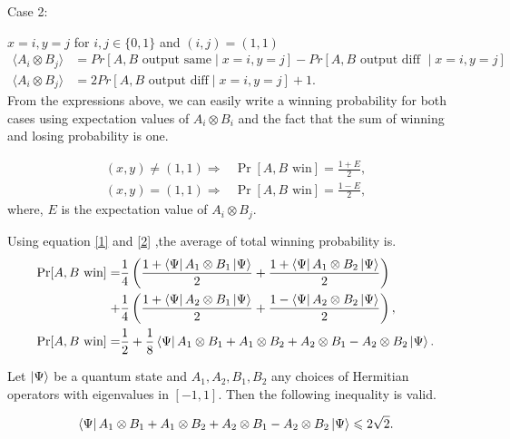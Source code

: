 Case 2:

$x=i,y=j$ for $i,j\in \{0,1\}$ and $(i,j)= (1,1)$
\begin{align}
\langle A_i\otimes B_j\rangle &=Pr[A,B \text{ output same} \mid  x=i,y=j]-Pr[A,B \text{ output diff }  \mid  x=i,y=j]\\
\langle A_i\otimes B_j\rangle&=2Pr[A,B \text{ output diff} \mid  x=i,y=j]+1.
\end{align}
From the expressions above, we can easily write a winning probability for both cases using expectation values of $A_i\otimes B_i$ and the fact that the sum of winning and losing probability  is one.


\begin{align}
(x,y)\neq(1,1) \Rightarrow& \Pr[A,B \text{ win}]=\frac{1+E}{2}\label{1},\\
(x,y)=(1,1) \Rightarrow &\Pr[A,B \text{ win}]=\frac{1-E}{2}\label{2},
\end{align}
where, $E$ is the expectation value of $A_i\otimes B_j$.

Using equation \ref{1} and \ref{2} ,the average of  total  winning probability is.
\begin{align}\label{TTP}
\Pr[A,B \text{ win}]=&\frac{1}{4}\left(\frac{1+\bra{\Psi}A_1\otimes B_1\ket{\Psi}}{2}
+\frac{1+\bra{\Psi}A_1\otimes B_2\ket{\Psi}}{2}\right)\nonumber\\
+&\frac{1}{4}\left(\frac{1+\bra{\Psi}A_2\otimes B_1\ket{\Psi}}{2}+\frac{1-\bra{\Psi}A_2\otimes B_2\ket{\Psi}}{2}\right),\nonumber\\
\Pr[A,B \text{ win}]=&\frac{1}{2}+\frac{1}{8}\bra{\Psi}A_1\otimes B_1+ A_1\otimes B_2+A_2\otimes B_1 -A_2\otimes B_2\ket{\Psi}.
\end{align}

\begin{theorem}
\label{thmTsireslonInequality}

Let $\ket{\Psi}$ be a quantum state and $A_1,A_2, B_1,B_2$ any choices of Hermitian operators with eigenvalues in $\left[-1,1\right]$. Then the following  inequality is valid.

\begin{align}
\bra{\Psi}A_1\otimes B_1+ A_1\otimes B_2+A_2\otimes B_1 -A_2\otimes B_2\ket{\Psi}\leqslant 2\sqrt{2}\label{TE}.
\end{align}

\end{theorem}

